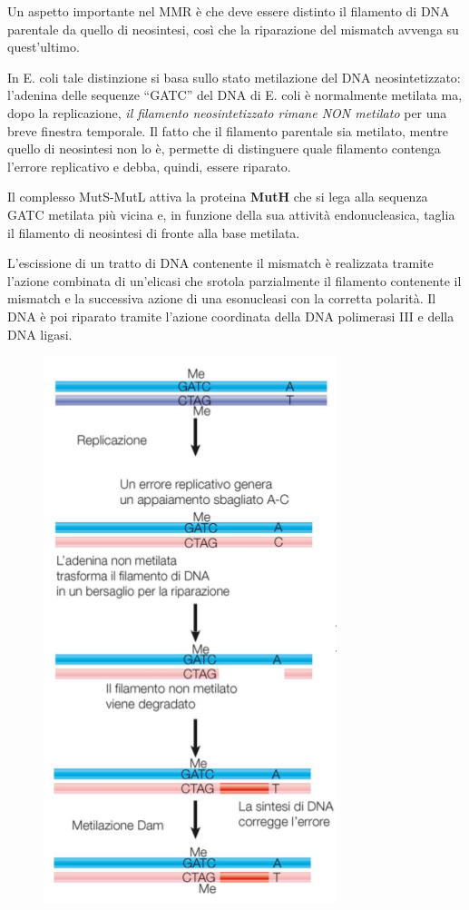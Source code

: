 \documentclass[11pt]{book}
\begin{document}
Un aspetto importante nel MMR è che deve essere distinto il filamento di
DNA parentale da quello di neosintesi, così che la riparazione del
mismatch avvenga su quest'ultimo.

In E. coli tale distinzione si basa sullo stato metilazione del DNA
neosintetizzato: l'adenina delle sequenze ``GATC'' del DNA di E. coli è
normalmente metilata ma, dopo la replicazione, \emph{il filamento
neosintetizzato rimane NON metilato} per una breve finestra temporale.
Il fatto che il filamento parentale sia metilato, mentre quello di
neosintesi non lo è, permette di distinguere quale filamento contenga
l'errore replicativo e debba, quindi, essere riparato.

Il complesso MutS-MutL attiva la proteina \textbf{MutH} che si lega alla
sequenza GATC metilata più vicina e, in funzione della sua attività
endonucleasica, taglia il filamento di neosintesi di fronte alla base
metilata.

L'escissione di un tratto di DNA contenente il mismatch è realizzata
tramite l'azione combinata di un'elicasi che srotola parzialmente il
filamento contenente il mismatch e la successiva azione di una
esonucleasi con la corretta polarità. Il DNA è poi riparato tramite
l'azione coordinata della DNA polimerasi III e della DNA ligasi.

\clearpage

\begin{figure}[htp]
\centering
\includegraphics[scale=0.8]{img/26_MMR.png}
\caption{}
\label{mmr}
\end{figure}
\end{document}
